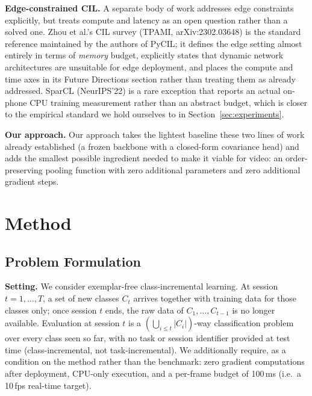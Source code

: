 \documentclass[11pt]{article}
\begin{document}
\textbf{Edge-constrained CIL.} A separate body of work addresses edge constraints explicitly, but treats
compute and latency as an open question rather than a solved one. Zhou et
al.'s CIL survey (TPAMI, arXiv:2302.03648) is the standard reference
maintained by the authors of PyCIL; it defines the edge setting almost
entirely in terms of \emph{memory} budget, explicitly states that dynamic
network architectures are unsuitable for edge deployment, and places the
compute and time axes in its Future Directions section rather than treating
them as already addressed. SparCL (NeurIPS'22) is a rare exception that
reports an actual on-phone CPU training measurement rather than an abstract
budget, which is closer to the empirical standard we hold ourselves to in
Section~\ref{sec:experiments}.

\textbf{Our approach.} Our approach takes the lightest baseline these two lines of work already
established (a frozen backbone with a closed-form covariance head) and
adds the smallest possible ingredient needed to make it viable for video:
an order-preserving pooling function with zero additional parameters and
zero additional gradient steps.


\section{Method}
\label{sec:method}

\subsection{Problem Formulation}
\label{sec:method-formulation}

\textbf{Setting.} We consider exemplar-free class-incremental learning. At session
$t = 1,\ldots,T$, a set of new classes $C_t$ arrives together with training
data for those classes only; once session $t$ ends, the raw data of
$C_1,\ldots,C_{t-1}$ is no longer available. Evaluation at session $t$ is a
$\left(\bigcup_{i \le t} |C_i|\right)$-way classification problem over every
class seen so far, with no task or session identifier provided at test time
(class-incremental, not task-incremental). We additionally require, as a
condition on the method rather than the benchmark: zero gradient
computations after deployment, CPU-only execution, and a per-frame budget of
100\,ms (i.e.\ a 10\,fps real-time target).
\end{document}
